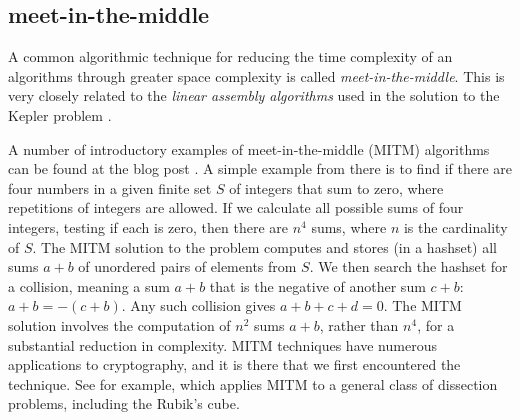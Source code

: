 \subsection{meet-in-the-middle}

A common algorithmic technique for reducing the time complexity of an algorithms
through greater space complexity is called {\it meet-in-the-middle}.  This is very closely related to
the  {\it linear assembly algorithms} used in the solution to the Kepler problem \cite{XX}.

A number of introductory examples of meet-in-the-middle (MITM) algorithms can be found
at the blog post \cite{XX}.
A simple example from there is to find if there are four numbers in a given finite set $S$ of integers
that sum to zero, where repetitions of integers are allowed.  
If we calculate all possible sums of four integers, testing if each is zero,
then there are $n^4$ sums, where $n$ is the cardinality of $S$.  The MITM solution to
the problem  computes and stores (in a hashset) all sums $a+b$ of unordered pairs of elements from $S$.
We then search the hashset for a collision, meaning a sum $a+b$ that is the negative of another sum $c+b$:
$a+b = -(c+b)$.
Any such collision gives $a+b+c+d=0$.  The MITM solution involves the computation of
$n^2$ sums $a+b$, rather than $n^4$, for a substantial reduction in complexity.  
MITM techniques have numerous applications to
cryptography, and it is there that we first encountered the technique.  See for example,
\cite{XX}
which applies MITM to a general class of dissection problems, including the Rubik's cube.


